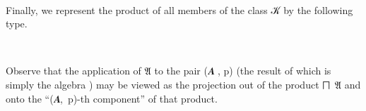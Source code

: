 \ccpad
\begin{code}
\>[0][@{}l@{\AgdaIndent{0}}]%
\>[1]\AgdaSpace{}%
\AgdaSymbol{:}\AgdaSpace{}%
\AgdaSpace{}%
\AgdaSpace{}%
\AgdaSpace{}%
\AgdaSpace{}%
\<%
\\
%
\>[1]\AgdaSpace{}%
\AgdaSymbol{=}\AgdaSpace{}%
\AgdaSpace{}%
\AgdaSymbol{(}\AgdaSpace{}%
\AgdaSymbol{:}\AgdaSpace{}%
\AgdaSymbol{)}\AgdaSpace{}%
\AgdaSpace{}%
\AgdaSpace{}%
\AgdaSpace{}%
\<%
\end{code}
\ccpad
Finally, we represent the product of all members of the class \ab 𝒦 by the following type.
\ccpad
\begin{code}%
\>[0][@{}l@{\AgdaIndent{0}}]%
\>[1]\AgdaSpace{}%
\AgdaSymbol{:}\AgdaSpace{}%
\AgdaSpace{}%
\AgdaSymbol{(}\AgdaSpace{}%
\AgdaSymbol{)}\AgdaSpace{}%
\<%
\\
%
\>[1]\AgdaSpace{}%
\AgdaSymbol{=}\AgdaSpace{}%
\AgdaSpace{}%
\<%
\end{code}
\ccpad
Observe that the application %
of \af 𝔄 to the pair (\ab 𝑨 , \ab p) (the result of which is simply the algebra ) may be viewed as the projection out of the product \af ⨅~\af 𝔄 and onto the ``(\ab 𝑨,~\ab p)-th component'' of that product.

